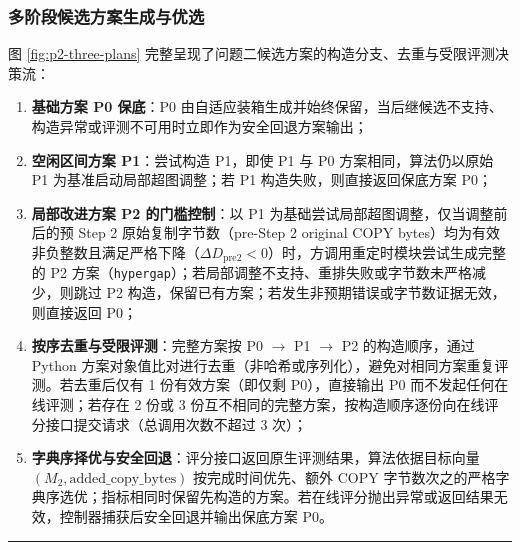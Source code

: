 \documentclass[anonymous,withtoc]{gmcm2026}
\providecommand{\tightlist}{\setlength{\itemsep}{0pt}\setlength{\parskip}{0pt}}
\begin{document}
\subsubsection{多阶段候选方案生成与优选}

图 \ref{fig:p2-three-plans} 完整呈现了问题二候选方案的构造分支、去重与受限评测决策流：

\begin{enumerate}
\def\labelenumi{\arabic{enumi}.}
\tightlist
\item
  \textbf{基础方案 P0 保底}：P0 由自适应装箱生成并始终保留，当后继候选不支持、构造异常或评测不可用时立即作为安全回退方案输出；
\item
  \textbf{空闲区间方案 P1}：尝试构造 P1，即使 P1 与 P0 方案相同，算法仍以原始 P1 为基准启动局部超图调整；若 P1 构造失败，则直接返回保底方案 P0；
\item
  \textbf{局部改进方案 P2 的门槛控制}：以 P1 为基础尝试局部超图调整，仅当调整前后的预 Step 2 原始复制字节数（pre-Step 2 original COPY bytes）均为有效非负整数且满足严格下降（\(\Delta D_{\mathrm{pre2}} < 0\)）时，方调用重定时模块尝试生成完整的 P2 方案（\texttt{hypergap}）；若局部调整不支持、重排失败或字节数未严格减少，则跳过 P2 构造，保留已有方案；若发生非预期错误或字节数证据无效，则直接返回 P0；
\item
  \textbf{按序去重与受限评测}：完整方案按 P0 \(\to\) P1 \(\to\) P2 的构造顺序，通过 Python 方案对象值比对进行去重（非哈希或序列化），避免对相同方案重复评测。若去重后仅有 1 份有效方案（即仅剩 P0），直接输出 P0 而不发起任何在线评测；若存在 2 份或 3 份互不相同的完整方案，按构造顺序逐份向在线评分接口提交请求（总调用次数不超过 3 次）；
\item
  \textbf{字典序择优与安全回退}：评分接口返回原生评测结果，算法依据目标向量 \((M_2,\allowbreak \text{added\_copy\_bytes})\) 按完成时间优先、额外 COPY 字节数次之的严格字典序选优；指标相同时保留先构造的方案。若在线评分抛出异常或返回结果无效，控制器捕获后安全回退并输出保底方案 P0。
\end{enumerate}

\FloatBarrier
\par{}\begingroup\normalsize
\captionsetup{type=algorithm,position=top,justification=raggedright,singlelinecheck=false,labelfont=bf}
\label{alg:p2-adaptive-hypergap}
\nopagebreak\hrule\nopagebreak
\end{document}
